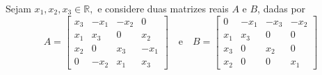 \documentclass[11pt,a4paper]{article}
\begin{document}
Sejam $x_1,x_2,x_3 \in \mathbb{R},$ e considere duas matrizes reais $A$ e $B$, dadas por
 \[
 A = \begin{bmatrix}
x_3 & -x_1 & -x_2 & 0 \\
x_1 & x_3 & 0 & x_2 \\
x_2 & 0 & x_3 & -x_1 \\
0 & -x_2 & x_1 & x_3
\end{bmatrix} \quad \mbox{e} \quad B = \begin{bmatrix}
0 & -x_1 & -x_3 & -x_2 \\
x_1 & x_3 & 0 & 0 \\
x_3 & 0 & x_2 & 0\\
x_2 & 0 & 0 & x_1
\end{bmatrix}
 \]
\end{document}
